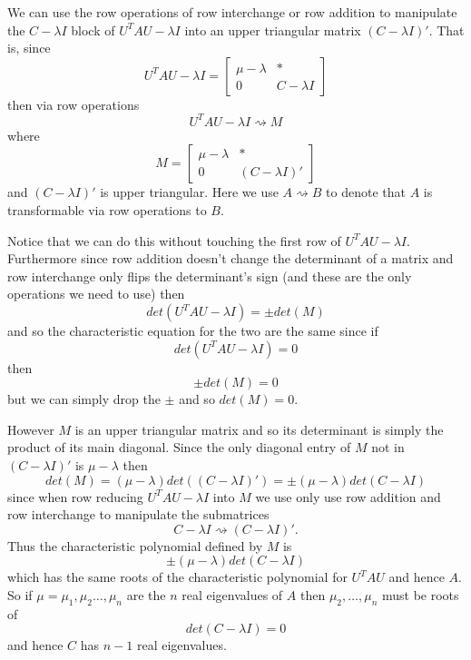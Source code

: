 \documentclass{book}
\begin{document}
{We can use the row operations of row interchange or row addition to manipulate the $C-\lambda I$  block of $U^TAU-\lambda I$ into an upper triangular matrix $(C-\lambda I)'$. That is, since 
$$
U^TAU-\lambda I=\left[
\begin{array}{c|c}
  \mu-\lambda& *\\ \hline
  0 & C-\lambda I
\end{array}
\right]
$$
then via row operations
$$
U^TAU-\lambda I\rightsquigarrow M
$$
where
$$
M=
\left[
\begin{array}{c|c}
  \mu-\lambda& *\\ \hline
  0 & (C-\lambda I)'
\end{array}
\right]
$$
and $(C-\lambda I)'$ is upper triangular. Here we use $A\rightsquigarrow B$ to denote that $A$ is transformable via row operations to $B$. 


Notice that we can do this without touching the first row of $U^TAU-\lambda I$. Furthermore since row addition doesn't change the determinant of a matrix and row interchange only flips the determinant's sign (and these are the only operations we need to use) then 
$$
det(U^TAU-\lambda I)=\pm det(M)
$$
and so the characteristic equation for the two are the same since if 
$$
det(U^TAU-\lambda I)=0
$$
then
$$
\pm det(M)=0
$$
but we can simply drop the $\pm$ and so $det(M)=0$. 

However $M$ is an upper triangular matrix and so its determinant is simply the product of its main diagonal. Since the only diagonal entry of $M$ not in $(C-\lambda I)'$ is $\mu -\lambda$ then 
$$
det(M)=(\mu-\lambda)det((C-\lambda I)')=\pm (\mu-\lambda)det(C-\lambda I)
$$
since when row reducing $U^TAU-\lambda I$ into $M$ we use only use row addition and row interchange to manipulate the submatrices
$$
C-\lambda I \rightsquigarrow (C-\lambda I)'.
$$
Thus the characteristic polynomial defined by $M$ is 
$$
\pm (\mu - \lambda)det(C-\lambda I)
$$
which has the same roots of the characteristic polynomial for $U^TAU$ and hence $A$. So if $\mu=\mu_1,\mu_2\ldots,\mu_n$ are the $n$ real eigenvalues of $A$ then $\mu_2,\ldots,\mu_n$ must be roots of $$det(C-\lambda I)=0$$ and hence $C$ has $n-1$ real eigenvalues. \vspace{.5cm}

}
\end{document}
